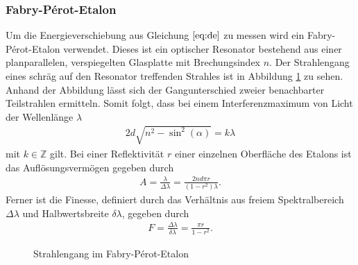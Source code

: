 \subsubsection{Fabry-Pérot-Etalon}
Um die Energieverschiebung aus Gleichung $\ref{eq:de}$ zu messen wird ein Fabry-Pérot-Etalon verwendet. Dieses ist ein optischer Resonator bestehend aus einer planparallelen, verspiegelten Glasplatte mit Brechungsindex $n$. Der Strahlengang eines schräg auf den Resonator treffenden Strahles ist in Abbildung \ref{fig:fabry} zu sehen. Anhand der Abbildung lässt sich der Gangunterschied zweier benachbarter Teilstrahlen ermitteln. Somit folgt, dass bei einem Interferenzmaximum von Licht der Wellenlänge $\lambda$
\begin{align}
  2d\sqrt{n^2-\sin^2(\alpha)}=k\lambda
\end{align}
mit $k \in \mathbb{Z}$ gilt. Bei einer Reflektivität $r$ einer einzelnen Oberfläche des Etalons ist das Auflösungsvermögen gegeben durch \cite{fabryperotaufloes}
\begin{align}
  A = \frac{\lambda}{\Delta \lambda}=\frac{2 n d \pi r}{(1-r^2)\lambda}.
\end{align}
Ferner ist die Finesse, definiert durch das Verhältnis aus freiem Spektralbereich $\Delta \lambda$ und Halbwertsbreite $\delta \lambda$, gegeben durch \cite{fabryperotaufloes}
\begin{align}
  F=\frac{\Delta \lambda}{\delta \lambda}=\frac{\pi r}{1-r^2}.
\end{align} 


\begin{figure}[h]
  \centering
  \caption{Strahlengang im Fabry-Pérot-Etalon}
  \label{fig:fabry}
\end{figure}

